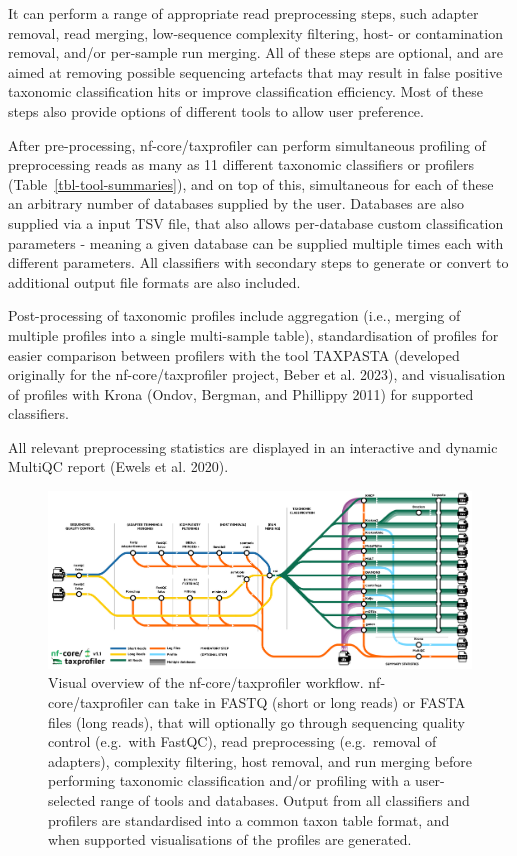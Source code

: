 \documentclass[
]{article}
\begin{document}
It can perform a range of appropriate read preprocessing steps, such
adapter removal, read merging, low-sequence complexity filtering, host-
or contamination removal, and/or per-sample run merging. All of these
steps are optional, and are aimed at removing possible sequencing
artefacts that may result in false positive taxonomic classification
hits or improve classification efficiency. Most of these steps also
provide options of different tools to allow user preference.

After pre-processing, nf-core/taxprofiler can perform simultaneous
profiling of preprocessing reads as many as 11 different taxonomic
classifiers or profilers (Table~\ref{tbl-tool-summaries}), and on top of
this, simultaneous for each of these an arbitrary number of databases
supplied by the user. Databases are also supplied via a input TSV file,
that also allows per-database custom classification parameters - meaning
a given database can be supplied multiple times each with different
parameters. All classifiers with secondary steps to generate or convert
to additional output file formats are also included.

Post-processing of taxonomic profiles include aggregation (i.e., merging
of multiple profiles into a single multi-sample table), standardisation
of profiles for easier comparison between profilers with the tool
TAXPASTA (developed originally for the nf-core/taxprofiler project,
Beber et al. 2023), and visualisation of profiles with Krona (Ondov,
Bergman, and Phillippy 2011) for supported classifiers.

All relevant preprocessing statistics are displayed in an interactive
and dynamic MultiQC report (Ewels et al. 2020).

\begin{figure}

{\centering \includegraphics{taxprofiler_tube.png}

}

\caption{\label{fig-workflow-diagram}Visual overview of the
nf-core/taxprofiler workflow. nf-core/taxprofiler can take in FASTQ
(short or long reads) or FASTA files (long reads), that will optionally
go through sequencing quality control (e.g.~with FastQC), read
preprocessing (e.g.~removal of adapters), complexity filtering, host
removal, and run merging before performing taxonomic classification
and/or profiling with a user-selected range of tools and databases.
Output from all classifiers and profilers are standardised into a common
taxon table format, and when supported visualisations of the profiles
are generated.}

\end{figure}
\end{document}

